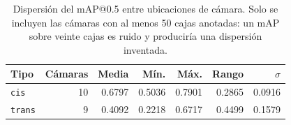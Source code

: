 \begin{table}[t]
  \centering
  \small
  \begin{tabular}{lrrrrrr}
    \toprule
    Tipo & Cámaras & Media & Mín. & Máx. & Rango & $\sigma$ \\
    \midrule
    \texttt{cis} & 10 & 0.6797 & 0.5036 & 0.7901 & 0.2865 & 0.0916 \\
    \texttt{trans} & 9 & 0.4092 & 0.2218 & 0.6717 & 0.4499 & 0.1579 \\
    \bottomrule
  \end{tabular}
  \caption{Dispersión del mAP@0.5 entre ubicaciones de cámara. Solo se incluyen las cámaras con al menos 50 cajas anotadas: un mAP sobre veinte cajas es ruido y produciría una dispersión inventada.}
  \label{tab:ubicaciones}
\end{table}
